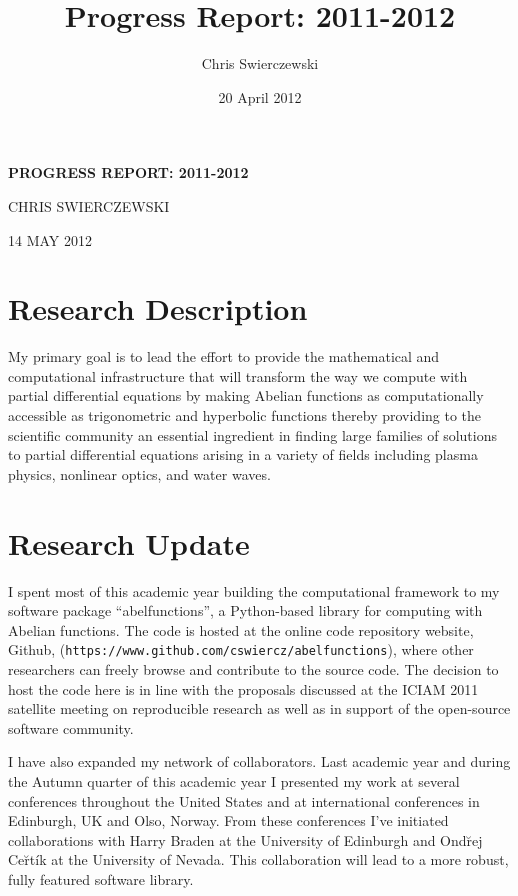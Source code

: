 \documentclass[11pt]{amsart}
\title{Progress Report: 2011-2012}
\author{Chris Swierczewski}
\date{20 April 2012}
\begin{document}
\begin{centering}
\large{\bf{PROGRESS REPORT: 2011-2012}}

\vspace{12pt}

CHRIS SWIERCZEWSKI

\vspace{12pt}

14 MAY 2012

\vspace{24pt}
\end{centering}

\section*{Research Description}

My primary goal is to lead the effort to provide the mathematical and 
computational infrastructure that will transform the way we compute with 
partial differential equations by making Abelian functions as computationally 
accessible as trigonometric and hyperbolic functions thereby providing to the
scientific community an essential ingredient in finding large families of 
solutions to partial differential equations arising in a variety of fields 
including plasma physics, nonlinear optics, and water waves. 

\section*{Research Update}

I spent most of this academic year building the computational framework to my 
software package ``abelfunctions'', a Python-based library for computing with 
Abelian functions. The code is hosted at the online code repository website, 
Github, ({\tt https://www.github.com/cswiercz/abelfunctions}), where other 
researchers can freely browse and contribute to the source code. The decision 
to host the code here is in line with the proposals discussed at the
ICIAM 2011 satellite meeting on reproducible research as well as in support of 
the open-source software community.

I have also expanded my network of collaborators. Last academic year and during
the Autumn quarter of this academic year I presented my work at several 
conferences throughout the United States and at international conferences in 
Edinburgh, UK and Olso, Norway. From these conferences I've initiated 
collaborations with Harry Braden at the University of Edinburgh and Ond\u{r}ej 
Ce\u{r}t\'{i}k at the University of Nevada. This collaboration will lead to a more 
robust, fully featured software library.
\end{document}
